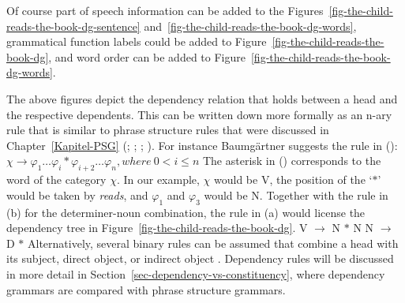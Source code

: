 Of course part of speech information can be added to the Figures~\ref{fig-the-child-reads-the-book-dg-sentence}
and~\ref{fig-the-child-reads-the-book-dg-words}, grammatical function labels could be added to
Figure~\ref{fig-the-child-reads-the-book-dg}, and word order can be added to Figure~\ref{fig-the-child-reads-the-book-dg-words}.


The above figures depict the dependency relation that holds between a head and the respective
dependents. This can be written down more formally as an n-ary rule\label{page-rule-format-dg} that is similar to phrase
structure rules that were discussed in Chapter~\ref{Kapitel-PSG} (\citealp[]{Gaifman65a}; \citealp[]{Hays64a-u}; \citealp[]{Baumgaertner70a}; \citealp[Section~4.1]{Heringer96a-u}). For instance Baumgärtner suggests the
rule in ():
\ea
$\chi \to \varphi_1 \ldots \varphi_i * \varphi_{i+2} \ldots \varphi_n, where~0 < i \leq n$
\z
The asterisk in () corresponds to the word of the category $\chi$. In our example, $\chi$
would be V, the position of the `$*$' would be taken by \emph{reads}, and $\varphi_1$ and
$\varphi_3$ would be N. Together with the rule in (b) for the determiner-noun combination, the rule in (a) would license
the dependency tree in Figure~\ref{fig-the-child-reads-the-book-dg}.
\eal
\ex V $\to$ N $*$ N
\ex N $\to$ D $*$
\zl
Alternatively, several binary rules can be assumed that combine a head with
its subject, direct object, or indirect object \citep{Kahane2009a}. Dependency rules will be discussed in
more detail in Section~\ref{sec-dependency-vs-constituency}, where dependency grammars are compared with phrase structure grammars.






